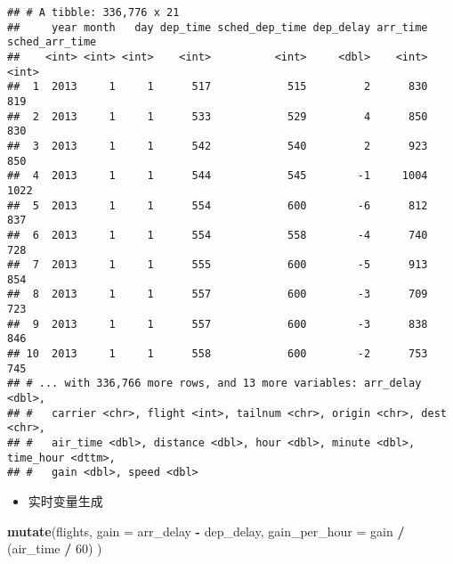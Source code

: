 \documentclass[
]{article}
\newenvironment{Shaded}{\begin{snugshade}}{\end{snugshade}}
\newcommand{\DataTypeTok}[1]{\textcolor[rgb]{0.13,0.29,0.53}{#1}}
\newcommand{\DecValTok}[1]{\textcolor[rgb]{0.00,0.00,0.81}{#1}}
\newcommand{\KeywordTok}[1]{\textcolor[rgb]{0.13,0.29,0.53}{\textbf{#1}}}
\newcommand{\NormalTok}[1]{#1}
\newcommand{\OperatorTok}[1]{\textcolor[rgb]{0.81,0.36,0.00}{\textbf{#1}}}
\newcommand{\StringTok}[1]{\textcolor[rgb]{0.31,0.60,0.02}{#1}}
\providecommand{\tightlist}{%
  \setlength{\itemsep}{0pt}\setlength{\parskip}{0pt}}
\begin{document}
\begin{verbatim}
## # A tibble: 336,776 x 21
##     year month   day dep_time sched_dep_time dep_delay arr_time sched_arr_time
##    <int> <int> <int>    <int>          <int>     <dbl>    <int>          <int>
##  1  2013     1     1      517            515         2      830            819
##  2  2013     1     1      533            529         4      850            830
##  3  2013     1     1      542            540         2      923            850
##  4  2013     1     1      544            545        -1     1004           1022
##  5  2013     1     1      554            600        -6      812            837
##  6  2013     1     1      554            558        -4      740            728
##  7  2013     1     1      555            600        -5      913            854
##  8  2013     1     1      557            600        -3      709            723
##  9  2013     1     1      557            600        -3      838            846
## 10  2013     1     1      558            600        -2      753            745
## # ... with 336,766 more rows, and 13 more variables: arr_delay <dbl>,
## #   carrier <chr>, flight <int>, tailnum <chr>, origin <chr>, dest <chr>,
## #   air_time <dbl>, distance <dbl>, hour <dbl>, minute <dbl>, time_hour <dttm>,
## #   gain <dbl>, speed <dbl>
\end{verbatim}

\begin{itemize}
\tightlist
\item
  实时变量生成
\end{itemize}

\begin{Shaded}
\begin{Highlighting}[]
\KeywordTok{mutate}\NormalTok{(flights,}
  \DataTypeTok{gain =}\NormalTok{ arr_delay }\OperatorTok{-}\StringTok{ }\NormalTok{dep_delay,}
  \DataTypeTok{gain_per_hour =}\NormalTok{ gain }\OperatorTok{/}\StringTok{ }\NormalTok{(air_time }\OperatorTok{/}\StringTok{ }\DecValTok{60}\NormalTok{)}
\NormalTok{)}
\end{Highlighting}
\end{Shaded}
\end{document}
